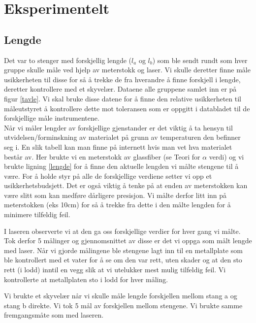 \documentclass[norsk,a4paper,12pt]{article}
\begin{document}
\section{Eksperimentelt}

\subsection{Lengde}
Det var to stenger med forskjellig lengde ($l_a$ og $l_b$) som ble sendt rundt som hver gruppe skulle måle ved hjelp av meterstokk og laser. Vi skulle deretter finne måle usikkerheten til disse for så å trekke de fra hverandre å finne forskjell i lengde, deretter kontrollere med et skyvelær. Dataene alle gruppene samlet inn er på figur \vref{tavle}. Vi skal bruke disse datene for å finne den relative usikkerheten til måleutstyret å kontrollere dette mot toleransen som er oppgitt i databladet til de forskjellige måle instrumentene. \\

Når vi måler lengder av forskjellige gjenstander er det viktig å ta hensyn til utvidelsen/forminskning av materialet på grunn av temperaturen den befinner seg i. En slik tabell kan man finne på internett \cite{wiki} hvis man vet hva materialet består av. Her brukte vi en meterstokk av glassfiber (se Teori for $\alpha$ verdi) og vi brukte ligning \ref{lengde} for å finne den aktuelle lengden vi målte stengene til å være. For å holde styr på alle de forskjellige verdiene setter vi opp et usikkerhetsbudsjett.  Det er også viktig å tenke på at enden av meterstokken kan være slitt som kan medføre dårligere presisjon. Vi målte derfor litt inn på meterstokken (eks 10cm) for så å trekke fra dette i den målte lengden for å minimere tilfeldig feil.

I laseren observerte vi at den ga oss forskjellige verdier for hver gang vi målte. Tok derfor 5 målinger og gjennomsnittet av disse er det vi oppga som målt lengde med laser. Når vi gjorde målingene ble stengene lagt inn til en metallplate som ble kontrollert med et vater for å se om den var rett, uten skader og at den sto rett (i lodd) inntil en vegg slik at vi utelukker mest mulig tilfeldig feil. Vi kontrollerte at metallplaten sto i lodd for hver måling.

Vi brukte et skyvelær når vi skulle måle lengde forskjellen mellom stang a og stang b direkte. Vi tok 5 mål av forskjellen mellom stengene. Vi brukte samme fremgangsmåte som med laseren. \\
\end{document}
